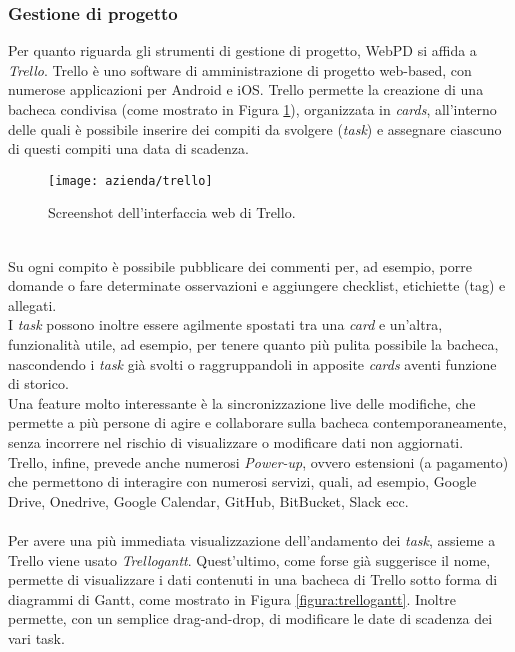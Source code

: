 \subsubsection{Gestione di progetto}
Per quanto riguarda gli strumenti di gestione di progetto, WebPD si affida a \textit{Trello}. 
Trello è uno software di amministrazione di progetto web-based, con numerose applicazioni per Android e iOS. Trello permette la creazione di una bacheca condivisa (come mostrato in Figura \ref{figura:trello}), organizzata in \textit{cards}, all'interno delle quali è possibile inserire dei compiti da svolgere (\textit{task}) e assegnare ciascuno di questi compiti una data di scadenza. \\
\begin{figure}[!h] 
	\centering 
	\texttt{[image: azienda/trello]} 
	\caption{Screenshot dell'interfaccia web di Trello.}
	\label{figura:trello}
\end{figure}\\
Su ogni compito è possibile pubblicare dei commenti per, ad esempio, porre domande o fare determinate osservazioni e aggiungere checklist, etichiette (tag) e allegati.\\ 
I \textit{task} possono inoltre essere agilmente spostati tra una \textit{card} e un'altra, funzionalità utile, ad esempio, per tenere quanto più pulita possibile la bacheca, nascondendo i \textit{task} già svolti o raggruppandoli in apposite \textit{cards} aventi funzione di storico.\\
Una feature molto interessante è la sincronizzazione live delle modifiche, che permette a più persone di agire e collaborare sulla bacheca contemporaneamente, senza incorrere nel rischio di visualizzare o modificare dati non aggiornati.\\
Trello, infine, prevede anche numerosi \textit{Power-up}, ovvero estensioni (a pagamento) che permettono di interagire con numerosi servizi, quali, ad esempio, Google Drive, Onedrive, Google Calendar, GitHub, BitBucket, Slack ecc.\\
\\
Per avere una più immediata visualizzazione dell'andamento dei \textit{task}, assieme a Trello viene usato \textit{Trellogantt}. Quest'ultimo, come forse già suggerisce il nome, permette di visualizzare i dati contenuti in una bacheca di Trello sotto forma di diagrammi di Gantt, come mostrato in Figura \ref{figura:trellogantt}. Inoltre permette, con un semplice drag-and-drop, di modificare le date di scadenza dei vari task.\\


